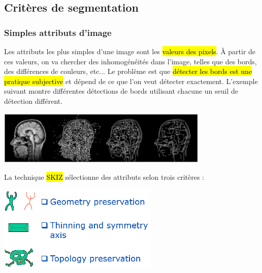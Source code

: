 \documentclass[letterpaper, 12pt]{article}
\newcommand{\alinea}{
\hspace*{0.5cm}}
\begin{document}
	\subsection{Critères de segmentation}
		\subsubsection{Simples attributs d'image}
			\alinea Les attributs les plus simples d'une image sont les \hl{valeurs des pixels}. \`A partir de ces valeurs,
				on va chercher des inhomogénéités dans l'image, telles que des bords, des différences de couleurs, etc...
				Le problème est que \hl{détecter les bords est une pratique subjective} et dépend de ce que l'on veut 
				détecter exactement. L'exemple suivant montre différentes détections de bords utilisant chacune un seuil de 
				détection différent.
			\begin{center}
				\includegraphics[width=4in]{Images/edges}
			\end{center}
			\alinea La technique \hl{SKIZ} sélectionne des attributs selon trois critères :
			\begin{center}
				\includegraphics[width=3in]{Images/skiz}
			\end{center}
\end{document}
